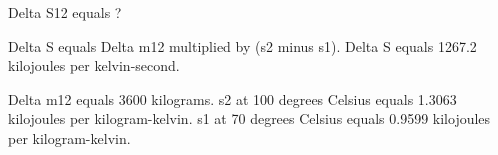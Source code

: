 Delta S12 equals ?  

Delta S equals Delta m12 multiplied by (s2 minus s1).  
Delta S equals 1267.2 kilojoules per kelvin-second.  

Delta m12 equals 3600 kilograms.  
s2 at 100 degrees Celsius equals 1.3063 kilojoules per kilogram-kelvin.  
s1 at 70 degrees Celsius equals 0.9599 kilojoules per kilogram-kelvin.